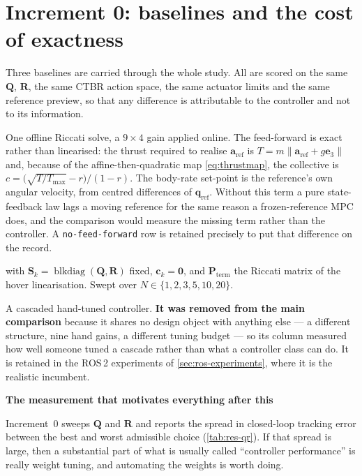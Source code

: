 \documentclass[11pt,a4paper,twoside,openright]{report}
\newcommand{\blkdiag}{\operatorname{blkdiag}}
\renewcommand{\vec}[1]{\bm{#1}}
\newcommand{\mat}[1]{\bm{#1}}
\newcommand{\quat}{\vec{q}}
\newcommand{\refsym}{\mathrm{ref}}
\theoremstyle{plain}
\theoremstyle{definition}
\theoremstyle{remark}
\newcommand{\keyhead}[1]{\textbf{\sffamily\small\textcolor{NavyDeep}{#1}}\par\vspace{2pt}}
\begin{document}
	\section{Increment 0: baselines and the cost of exactness}
	\label{sec:baselines}

	Three baselines are carried through the whole study. All are scored on the same
	$\mat Q$, $\mat R$, the same CTBR action space, the same actuator limits and the
	same reference preview, so that any difference is attributable to the controller
	and not to its information.

	\begin{description}[leftmargin=*,style=nextline]
		\item[LQR with reference feed-forward.] One offline Riccati solve, a $9\times4$
		gain applied online. The feed-forward is exact rather than linearised: the
		thrust required to realise $\vec a_\refsym$ is
		$T=m\|\vec a_\refsym+g\vec e_3\|$ and, because of the affine-then-quadratic map
		\cref{eq:thrustmap}, the collective is
		$c=\big(\sqrt{T/T_{\max}}-r\big)/(1-r)$. The body-rate set-point is the
		reference's own angular velocity, from centred differences of $\quat_\refsym$.
		Without this term a pure state-feedback law lags a moving reference for the
		same reason a frozen-reference MPC does, and the comparison would measure the
		missing term rather than the controller. A \texttt{no-feed-forward} row is
		retained precisely to put that difference on the record.
		\item[NMPC with horizon $N$.]  with
		$\mat S_k=\blkdiag(\mat Q,\mat R)$ fixed, $\vec c_k=\vec 0$, and
		$\mat P_\mathrm{term}$ the Riccati matrix of the hover linearisation. Swept
		over $N\in\{1,2,3,5,10,20\}$.
		\item[PID.] A cascaded hand-tuned controller. \textbf{It was removed from the
			main comparison} because it shares no design object with anything else --- a
		different structure, nine hand gains, a different tuning budget --- so its
		column measured how well someone tuned a cascade rather than what a controller
		class can do. It is retained in the ROS\,2 experiments of
		\cref{sec:ros-experiments}, where it is the realistic incumbent.
	\end{description}

	\begin{keybox}
		\keyhead{The measurement that motivates everything after this}
		Increment~0 sweeps $\mat Q$ and $\mat R$ and reports the spread in closed-loop
		tracking error between the best and worst admissible choice
		(\cref{tab:res-qr}). If that spread is large, then a substantial part of what
		is usually called ``controller performance'' is really weight tuning, and
		automating the weights is worth doing.
	\end{keybox}
\end{document}
